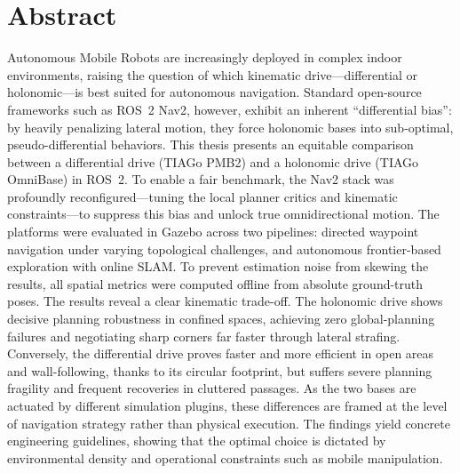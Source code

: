 \documentclass[12pt, a4paper, twoside, openright]{report}
\begin{document}


\clearpage
\thispagestyle{empty}
\null
\clearpage


\cleardoublepage
\chapter*{Abstract}
Autonomous Mobile Robots are increasingly deployed in complex indoor environments, raising the question of which kinematic drive---differential or holonomic---is best suited for autonomous navigation. Standard open-source frameworks such as ROS~2 Nav2, however, exhibit an inherent ``differential bias'': by heavily penalizing lateral motion, they force holonomic bases into sub-optimal, pseudo-differential behaviors. This thesis presents an equitable comparison between a differential drive (TIAGo PMB2) and a holonomic drive (TIAGo OmniBase) in ROS~2. To enable a fair benchmark, the Nav2 stack was profoundly reconfigured---tuning the local planner critics and kinematic constraints---to suppress this bias and unlock true omnidirectional motion. The platforms were evaluated in Gazebo across two pipelines: directed waypoint navigation under varying topological challenges, and autonomous frontier-based exploration with online SLAM. To prevent estimation noise from skewing the results, all spatial metrics were computed offline from absolute ground-truth poses. The results reveal a clear kinematic trade-off. The holonomic drive shows decisive planning robustness in confined spaces, achieving zero global-planning failures and negotiating sharp corners far faster through lateral strafing. Conversely, the differential drive proves faster and more efficient in open areas and wall-following, thanks to its circular footprint, but suffers severe planning fragility and frequent recoveries in cluttered passages. As the two bases are actuated by different simulation plugins, these differences are framed at the level of navigation strategy rather than physical execution. The findings yield concrete engineering guidelines, showing that the optimal choice is dictated by environmental density and operational constraints such as mobile manipulation.
\end{document}
